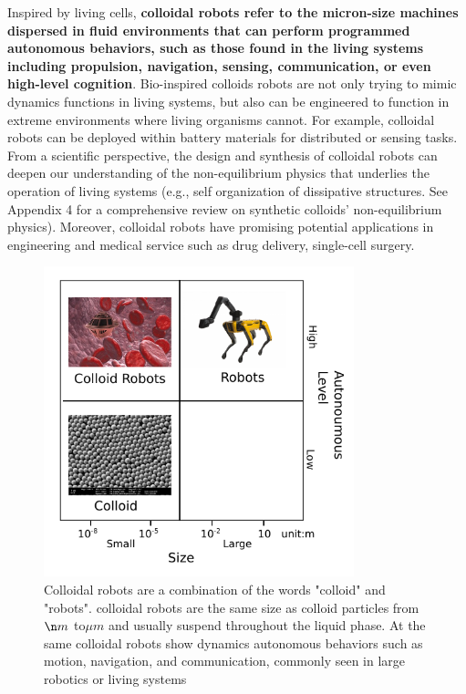 Inspired by living cells, \textbf{colloidal robots refer to the micron-size machines  dispersed in fluid environments that can perform  programmed autonomous behaviors, such as those found in the living systems including propulsion, navigation, sensing, communication, or even high-level cognition}. Bio-inspired colloids robots are not only trying to mimic dynamics functions in living systems, but also can be engineered to function in extreme environments where living organisms cannot. For example, colloidal robots can be deployed within battery materials for distributed or sensing tasks. From a scientific perspective, the design and synthesis of colloidal robots can deepen our understanding of the non-equilibrium physics that underlies the operation of living systems (e.g., self organization of dissipative structures. See Appendix 4 for a comprehensive review on  synthetic colloids' non-equilibrium physics). Moreover, colloidal robots have promising potential applications in engineering and medical service such as drug delivery\autocite{fu2012controlled,de2017micromotor}, single-cell surgery\autocite{li2017micro}. 

\begin{figure}
\centering
\includegraphics[width=9cm]{figures/1_1.pdf}
\caption{Colloidal robots are a combination of the words "colloid" and "robots". colloidal robots are the same size as colloid particles from $\n m$ to$\mu m$ and usually suspend throughout the liquid phase. At the same colloidal robots show dynamics autonomous behaviors such as motion, navigation, and communication, commonly seen in large robotics or living systems}
\label{fig:1.1}
\end{figure}


